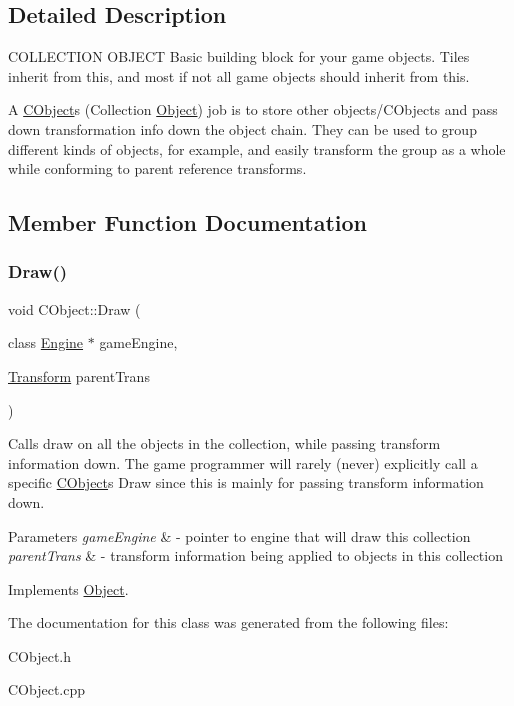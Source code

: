 \subsection{Detailed Description}
C\+O\+L\+L\+E\+C\+T\+I\+ON O\+B\+J\+E\+CT Basic building block for your game objects. Tiles inherit from this, and most if not all game objects should inherit from this. 

A \hyperlink{class_c_object}{C\+Object}\textquotesingle{}s (Collection \hyperlink{class_object}{Object}) job is to store other objects/\+C\+Objects and pass down transformation info down the object chain. They can be used to group different kinds of objects, for example, and easily transform the group as a whole while conforming to parent reference transforms. 

\subsection{Member Function Documentation}
\hypertarget{class_c_object_a65338dd4ac20a20340875597344c0c4b}{}\label{class_c_object_a65338dd4ac20a20340875597344c0c4b} 
\subsubsection{\texorpdfstring{Draw()}{Draw()}}
{\footnotesize\ttfamily void C\+Object\+::\+Draw (\begin{DoxyParamCaption}\item[{class \hyperlink{class_engine}{Engine} $\ast$}]{game\+Engine,  }\item[{\hyperlink{class_transform}{Transform}}]{parent\+Trans }\end{DoxyParamCaption})\hspace{0.3cm}{\ttfamily [virtual]}}



Calls draw on all the objects in the collection, while passing transform information down. The game programmer will rarely (never) explicitly call a specific \hyperlink{class_c_object}{C\+Object}\textquotesingle{}s Draw since this is mainly for passing transform information down. 


\begin{DoxyParams}{Parameters}
{\em game\+Engine} & -\/ pointer to engine that will draw this collection \\
\hline
{\em parent\+Trans} & -\/ transform information being applied to objects in this collection \\
\hline
\end{DoxyParams}


Implements \hyperlink{class_object_adeb7a19aaca51dbf093b37fd21c5e41f}{Object}.



The documentation for this class was generated from the following files\+:\begin{DoxyCompactItemize}
\item 
C\+Object.\+h\item 
C\+Object.\+cpp\end{DoxyCompactItemize}
